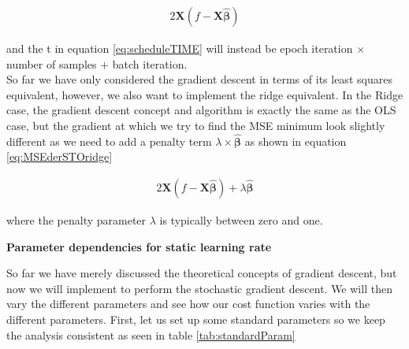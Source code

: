 \documentclass[12pt,a4paper]{article}
\begin{document}
\begin{equation}\label{eq:MSEderSTO}
\begin{aligned}
2 \textbf{X}(f - \textbf{X}\boldsymbol{\hat{\beta}}) 
\end{aligned}
\end{equation}

\noindent and the t in equation \ref{eq:scheduleTIME} will instead be epoch iteration $\times$ number of samples $+$ batch iteration.
\\
So far we have only considered the gradient descent in terms of its least squares equivalent, however, we also want to implement the ridge equivalent. In the Ridge case, the gradient descent concept and algorithm is exactly the same as the OLS case, but the gradient at which we try to find the MSE minimum look slightly different as we need to add a penalty term $\lambda \times \boldsymbol{\hat{\beta}}$ as shown in equation \ref{eq:MSEderSTOridge}

\begin{equation}\label{eq:MSEderSTOridge}
\begin{aligned}
2 \textbf{X}(f - \textbf{X}\boldsymbol{\hat{\beta}}) + \lambda \boldsymbol{\hat{\beta}}
\end{aligned}
\end{equation}

\noindent where the penalty parameter $\lambda$ is typically between zero and one. 

\begin{center}
\large{\textbf{Parameter dependencies for static learning rate}}
\end{center}

\noindent So far we have merely discussed the theoretical concepts of gradient descent, but now we will implement to perform the stochastic gradient descent. We will then vary the different parameters and see how our cost function varies with the different parameters. First, let us set up some standard parameters so we keep the analysis consistent as seen in table \ref{tab:standardParam}
\end{document}

